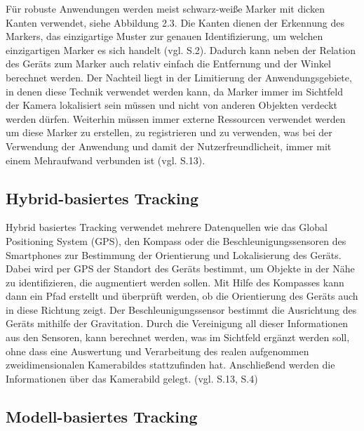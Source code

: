 Für robuste Anwendungen werden meist schwarz-weiße Marker mit dicken Kanten verwendet, siehe Abbildung 2.3. Die Kanten dienen der Erkennung des Markers, das einzigartige Muster zur genauen Identifizierung, um welchen einzigartigen Marker es sich handelt (vgl. \cite{markers} S.2). Dadurch kann neben der Relation des Geräts zum Marker auch relativ einfach die Entfernung und der Winkel berechnet werden. Der Nachteil liegt in der Limitierung der Anwendungsgebiete, in denen diese Technik verwendet werden kann, da Marker immer im Sichtfeld der Kamera lokalisiert sein müssen und nicht von anderen Objekten verdeckt werden dürfen. Weiterhin müssen immer externe Ressourcen verwendet werden um diese Marker zu erstellen, zu registrieren und zu verwenden, was bei der Verwendung der Anwendung und damit der Nutzerfreundlicheit, immer mit einem Mehraufwand verbunden ist (vgl. \cite{comparative_sdks} S.13).

\subsection{Hybrid-basiertes Tracking}

Hybrid basiertes Tracking verwendet mehrere Datenquellen wie das Global Positioning System (GPS), den Kompass oder die Beschleunigungssensoren des Smartphones zur Bestimmung der Orientierung und Lokalisierung des Geräts. Dabei wird per GPS der Standort des Geräts bestimmt, um Objekte in der Nähe zu identifizieren, die augmentiert werden sollen. Mit Hilfe des Kompasses kann dann ein Pfad erstellt und überprüft werden, ob die Orientierung des Geräts auch in diese Richtung zeigt. Der Beschleunigungssensor bestimmt die Ausrichtung des Geräts mithilfe der Gravitation. Durch die Vereinigung all dieser Informationen aus den Sensoren, kann berechnet werden, was im Sichtfeld ergänzt werden soll, ohne dass eine Auswertung und Verarbeitung des realen aufgenommen zweidimensionalen Kamerabildes stattzufinden hat. Anschließend werden die Informationen über das Kamerabild gelegt.  (vgl. \cite{comparative_sdks} S.13, \cite{vorraussetzungen} S.4)

\subsection{Modell-basiertes Tracking}

